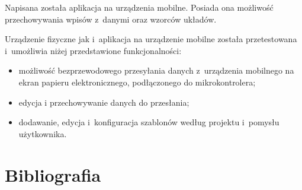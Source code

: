\documentclass[a4paper,12pt, twoside]{article}
\begin{document}
    	Napisana została aplikacja na urządzenia mobilne. Posiada ona możliwość przechowywania wpisów z~danymi oraz wzorców układów.
    	
    	Urządzenie fizyczne jak i~aplikacja na urządzenie mobilne została przetestowana i~umożliwia niżej przedstawione funkcjonalności:
    	\begin{itemize}
    	    \item możliwość bezprzewodowego przesyłania danych z~urządzenia mobilnego na ekran papieru elektronicznego, podłączonego do mikrokontrolera;
    	    \item edycja i przechowywanie danych do przesłania;
    	    \item dodawanie, edycja i~konfiguracja szablonów według projektu i~pomysłu użytkownika.
    	\end{itemize}
    	
       
        \newpage
    	\leavevmode\thispagestyle{empty}\newpage
    	\section{Bibliografia}
    	
\end{document}
